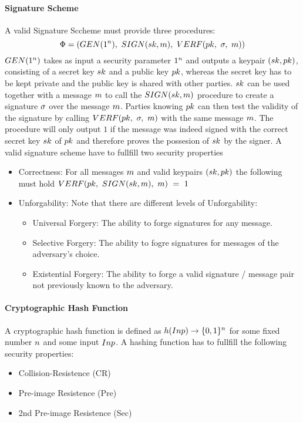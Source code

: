 \paragraph{Signature Scheme}
A valid Signature Sccheme must provide three procedures:
\[ \Phi = (GEN(1^n) ,~ SIGN(sk, m) ,~ VERF(pk ,~ \sigma ,~ m)) \]
$GEN(1^n)$ takes as input a security parameter $1^n$ and outputs a keypair $(sk, pk)$, consisting of a secret key $sk$ and a public key $pk$, whereas
the secret key has to be kept private and the public key is shared with other parties.
$sk$ can be used together with a message $m$ to call the $SIGN(sk, m)$ procedure to create a signature $\sigma$ over the message $m$.
Parties knowing $pk$ can then test the validity of the signature by calling $VERF(pk ,~ \sigma ,~ m)$ with the same message $m$. The procedure will only output $1$ if the message was
indeed signed with the correct secret key $sk$ of $pk$ and therefore proves the possesion of $sk$ by the signer.
A valid signature scheme have to fullfill two security properties
\begin{itemize}
    \item Correctness: For all messages $m$ and valid keypairs $(sk, pk)$ the following must hold $VERF(pk ,~ SIGN(sk, m) ,~ m) ~=~ 1$
    \item Unforgability: Note that there are different levels of Unforgability:~\cite{goldwasser1988digital}
    \begin{itemize}
        \item Universal Forgery: The ability to forge signatures for any message.
        \item Selective Forgery: The ability to fogre signatures for messages of the adversary's choice.
        \item Existential Forgery: The ability to forge a valid signature / message pair not previously known to the adversary.
    \end{itemize}
\end{itemize}

\paragraph{Cryptographic Hash Function}
A cryptographic hash function is defined as $h (Inp) \rightarrow \{0,1\}^{n}$ for some fixed number $n$ and some input $Inp$. A hashing function
has to fullfill the following security properties:~\cite{al2011cryptographic}
\begin{itemize}
    \item Collision-Resistence (CR)
    \item Pre-image Resistence (Pre)
    \item 2nd Pre-image Resistence (Sec)
\end{itemize}


